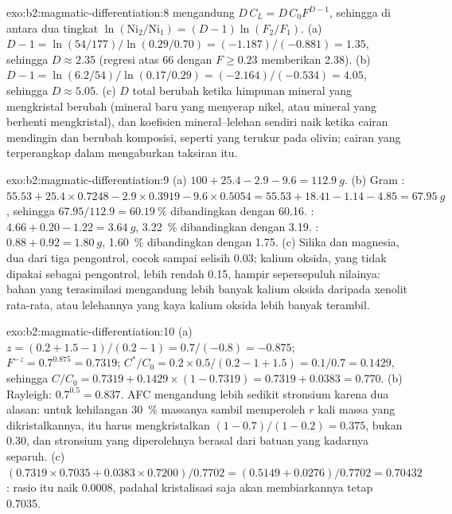 \begin{solution}{exo:b2:magmatic-differentiation:8}
 mengandung $D\,C_L = D\,C_0F^{D-1}$, sehingga di antara dua tingkat
$\ln(\mathrm{Ni}_2/\mathrm{Ni}_1) = (D - 1)\ln(F_2/F_1)$. (a) $D - 1 = \ln(54/177)/
\ln(0.29/0.70) = (-1.187)/(-0.881) = 1.35$, sehingga $D \approx 2.35$ (regresi atas
66  dengan $F \ge 0.23$ memberikan 2.38). (b) $D - 1 = \ln(6.2/54)/\ln(0.17/0.29) = (-2.164)/(-0.534)
= 4.05$, sehingga $D \approx 5.05$. (c) $D$ total berubah ketika himpunan mineral yang
mengkristal berubah (mineral baru yang menyerap nikel, atau mineral yang berhenti mengkristal), dan
koefisien mineral--lelehan sendiri naik ketika cairan mendingin dan berubah
komposisi, seperti yang terukur pada olivin; cairan yang terperangkap dalam  mengaburkan
taksiran itu.
\end{solution}

\begin{solution}{exo:b2:magmatic-differentiation:9}
(a) $100 + 25.4 - 2.9 - 9.6 = \qty{112.9}{g}$. (b) Gram : $55.53 +
25.4\times0.7248 - 2.9\times0.3919 - 9.6\times0.5054 = 55.53 + 18.41 - 1.14 - 4.85 =
\qty{67.95}{g}$, sehingga $67.95/112.9 = \qty{60.19}{\percent}$ dibandingkan dengan 60.16. :
$4.66 + 0.20 - 1.22 = \qty{3.64}{g}$, \qty{3.22}{\percent} dibandingkan dengan 3.19. :
$0.88 + 0.92 = \qty{1.80}{g}$, \qty{1.60}{\percent} dibandingkan dengan 1.75. (c) Silika dan magnesia, dua dari tiga
pengontrol, cocok sampai selisih 0.03; kalium oksida, yang tidak dipakai sebagai pengontrol, lebih rendah 0.15, hampir
sepersepuluh nilainya: bahan yang terasimilasi mengandung lebih banyak kalium oksida daripada xenolit
rata-rata, atau lelehannya yang kaya kalium oksida lebih banyak terambil.
\end{solution}

\begin{solution}{exo:b2:magmatic-differentiation:10}
(a) $z = (0.2 + 1.5 - 1)/(0.2 - 1) = 0.7/(-0.8) = -0.875$; $F^{-z} = 0.7^{0.875} =
0.7319$; $C^*/C_0 = 0.2\times0.5/(0.2 - 1 + 1.5) = 0.1/0.7 = 0.1429$, sehingga $C/C_0 =
0.7319 + 0.1429\times(1 - 0.7319) = 0.7319 + 0.0383 = 0.770$. (b) Rayleigh:
$0.7^{0.5} = 0.837$.  AFC mengandung lebih sedikit stronsium karena dua alasan: untuk kehilangan
\qty{30}{\percent} massanya sambil memperoleh $r$ kali massa yang dikristalkannya,  itu harus
mengkristalkan $(1 - 0.7)/(1 - 0.2) = 0.375$, bukan 0.30, dan stronsium yang diperolehnya
berasal dari batuan yang kadarnya separuh. (c) $(0.7319\times0.7035 + 0.0383\times0.7200)/0.7702
= (0.5149 + 0.0276)/0.7702 = 0.70432$: rasio itu naik 0.0008, padahal
kristalisasi saja akan membiarkannya tetap 0.7035.
\end{solution}

